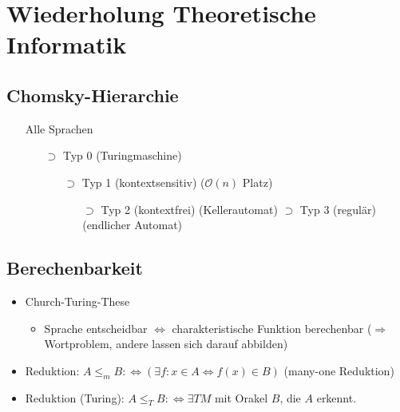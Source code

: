 \section{Wiederholung Theoretische Informatik}
    \subsection{Chomsky-Hierarchie}
        \begin{itemize}
            \item[] Alle Sprachen
                \begin{itemize}
                    \item[$\supset$] Typ 0 (Turingmaschine)
                    \begin{itemize}
                        \item[$\supset$] Typ 1 (kontextsensitiv) ($\mathcal{O}(n)$ Platz)
                        \begin{itemize}
                            \item[$\supset$] Typ 2 (kontextfrei) (Kellerautomat)
                            \subitem$\supset$ Typ 3 (regulär) (endlicher Automat)
                        \end{itemize}
                    \end{itemize}
                \end{itemize}
        \end{itemize}
    \subsection{Berechenbarkeit}
        \begin{itemize}
            \item Church-Turing-These
            \begin{itemize}
                \item Sprache entscheidbar $\Leftrightarrow$ charakteristische Funktion berechenbar ($\Rightarrow$ Wortproblem, andere lassen sich darauf abbilden)
            \end{itemize}
            \item Reduktion: $A\le_m B :\Leftrightarrow \left(\exists f: x\in A\Leftrightarrow f(x)\in B\right)$ (many-one Reduktion)
            \item Reduktion (Turing): $A\le_T B:\Leftrightarrow\exists TM$ mit Orakel $B$, die $A$ erkennt.
        \end{itemize}
